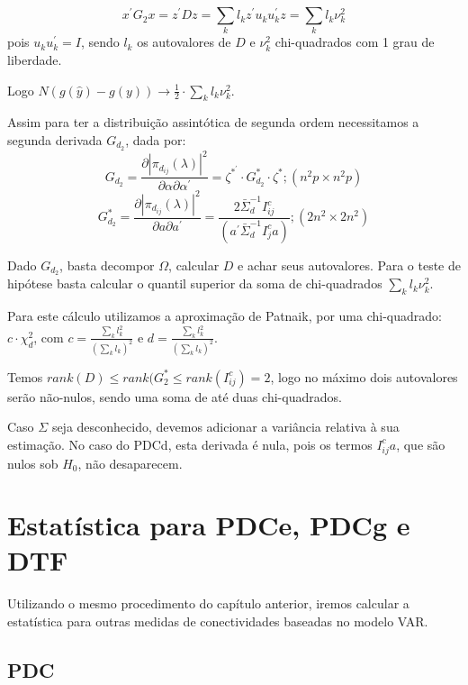 \documentclass[a4paper,10pt]{article}
\begin{document}
\begin{equation}
x^{'} G_{2} x = z^{'} D z = \sum_{k} {l_{k} z^{'} u_{k} u_{k}^{'} z} = \sum_{k} {l_{k} \nu_{k}^{2}}
\end{equation}
pois $u_{k} u_{k}^{'} = I$, sendo $l_{k}$ os autovalores de $D$ e $\nu_{k}^{2}$ chi-quadrados com 1 grau de liberdade.

Logo $N (g(\hat{y}) - g(y)) \to \frac{1}{2} \cdot \sum_{k} {l_{k} \nu_{k}^{2}}$.

Assim para ter a distribuição assintótica de segunda ordem necessitamos a segunda derivada $G_{d_2}$, dada por:
\begin{equation}
G_{d_2} = \frac{\partial |\pi_{d_{ij}}(\lambda)|^{2}}{\partial \alpha \partial \alpha^{'}} = \zeta^{\ast^{'}} \cdot G_{d_2}^{\ast} \cdot \zeta^{\ast}; (n^{2}p \times n^{2}p)
\end{equation}
\begin{equation}
G_{d_2}^{\ast} = \frac{\partial |\pi_{d_{ij}}(\lambda)|^{2}}{\partial a \partial a^{'}} = \frac{2 \bar{\Sigma}_{d}^{-1} I_{ij}^{c}}{(a^{'} \bar{\Sigma}_{d}^{-1} I_{j}^{c} a)}; (2n^{2} \times 2n^{2})
\end{equation}

Dado $G_{d_2}$, basta decompor $\Omega$, calcular $D$ e achar seus autovalores. Para o teste de hipótese basta calcular o quantil superior da soma de chi-quadrados $\sum_{k} {l_{k} \nu_{k}^{2}}$. 

Para este cálculo utilizamos a aproximação de Patnaik, por uma chi-quadrado: $c\cdot \chi^2_d$, com $c = \frac{\sum_k {l_k^2}}{(\sum_k {l_k})^2}$ e $d = \frac{\sum_k {l_k^2}}{(\sum_k {l_k})^2}$.

Temos $rank(D) \le rank(G_{2}^{\ast} \le rank(I_{ij}^{c}) = 2$, logo no máximo dois autovalores serão não-nulos, sendo uma soma de até duas chi-quadrados.

Caso $\Sigma$ seja desconhecido, devemos adicionar a variância relativa à sua estimação. No caso do PDCd, esta derivada é nula, pois os termos $I_{ij}^{c} a$, que são nulos sob $H_0$, não desaparecem.


\section{Estatística para PDCe, PDCg e DTF}

Utilizando o mesmo procedimento do capítulo anterior, iremos calcular a estatística para outras medidas de conectividades baseadas no modelo VAR.

\subsection{PDC}
\end{document}
